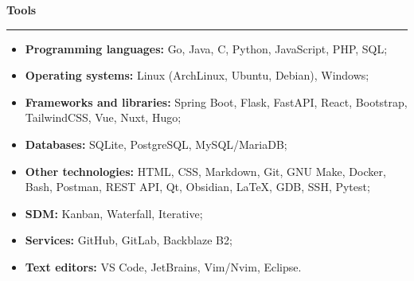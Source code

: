 {\vspace{0.5cm} \hspace{-0.5cm} \Large \textbf{Tools}}
\par\noindent\rule{\textwidth}{0.1mm}

\begin{itemize}
    \item \textbf{Programming languages:} Go, Java, C, Python, JavaScript, PHP, SQL;
    \item \textbf{Operating systems:} Linux (ArchLinux, Ubuntu, Debian), Windows;
    \item \textbf{Frameworks and libraries:} Spring Boot, Flask, FastAPI, React, Bootstrap, TailwindCSS, Vue, Nuxt, Hugo;
    \item \textbf{Databases:} SQLite, PostgreSQL, MySQL/MariaDB;
    \item \textbf{Other technologies:} HTML, CSS, Markdown, Git, GNU Make, Docker, Bash, Postman,
        REST API, Qt, Obsidian, \LaTeX, GDB, SSH, Pytest;
    \item \textbf{SDM:} Kanban, Waterfall, Iterative;
    \item \textbf{Services:} GitHub, GitLab, Backblaze B2; 
    \item \textbf{Text editors:} VS Code, JetBrains, Vim/Nvim, Eclipse.
\end{itemize}
